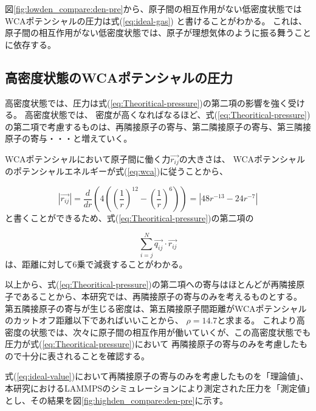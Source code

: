 \documentclass[titlepage]{jsreport}
\begin{document}
{{{図\ref{fig:lowden_compare:den-pre}から、原子間の相互作用がない低密度状態ではWCAポテンシャルの圧力は式(\ref{eq:ideal-gas})
と書けることがわかる。
これは、原子間の相互作用がない低密度状態では、原子が理想気体のように振る舞うことに依存する。

\subsection{高密度状態のWCAポテンシャルの圧力}\label{results-sec:WCA-press-high-density}
高密度状態では、圧力は式(\ref{eq:Theoritical-pressure})の第二項の影響を強く受ける。
高密度状態では、
密度が高くなればなるほど、式(\ref{eq:Theoritical-pressure})の第二項で考慮するものは、再隣接原子の寄与、第二隣接原子の寄与、第三隣接原子の寄与・・・と増えていく。

WCAポテンシャルにおいて原子間に働く力$\vec{r_{ij}}$の大きさは、
WCAポテンシャルのポテンシャルエネルギーが式(\ref{eq:wca})に従うことから、

\large
\begin{equation}
    | {\vec{r_{ij}}} |=\frac{d}{dr}\left(4\left(\left(\frac{1}{r}\right)^{12}-\left(\frac{1}{r}\right)^6\right)\right)=| 48r^{-13}-24r^{-7} |\label{eq:power}
\end{equation}
\normalsize
と書くことができるため、式(\ref{eq:Theoritical-pressure})の第二項の

\large
\begin{equation}
    \sum_{i=j}^N\vec{q_{ij}} \cdot \vec{r_{ij}} \label{eq:}
\end{equation}
\normalsize
は、距離に対して6乗で減衰することがわかる。

以上から、式(\ref{eq:Theoritical-pressure})の第二項への寄与はほとんどが再隣接原子であることから、本研究では、再隣接原子の寄与のみを考えるものとする。
第五隣接原子の寄与が生じる密度は、第五隣接原子間距離がWCAポテンシャルのカットオフ距離以下であればいいことから、
$\rho=14.7$と求まる。
これより高密度の状態では、次々に原子間の相互作用が働いていくが、この高密度状態でも圧力が式(\ref{eq:Theoritical-pressure})において
再隣接原子の寄与のみを考慮したもので十分に表されることを確認する。

式(\ref{eq:ideal-value})において再隣接原子の寄与のみを考慮したものを「理論値」、本研究におけるLAMMPSのシミュレーションにより測定された圧力を「測定値」とし、その結果を図\ref{fig:highden_compare:den-pre}に示す。

}}}
\end{document}
